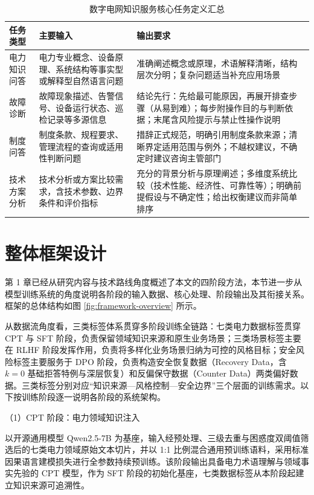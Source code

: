\documentclass[fontset=fandol,type=master,campus=shenzhen,etitleauto=true]{hithesisbook}
\begin{document}
\begin{table}[htbp]
\centering
\caption{数字电网知识服务核心任务定义汇总}
\label{tab:task-def}
\small
\begin{tabular}{p{2.5cm}p{4.5cm}p{6.0cm}}
\toprule
\textbf{任务类型} & \textbf{主要输入} & \textbf{输出要求} \\
\midrule
电力知识问答 & 电力专业概念、设备原理、系统结构等事实型或解释型自然语言问题 & 准确阐述概念或原理，术语解释清晰，结构层次分明；复杂问题适当补充应用场景 \\
\addlinespace
故障诊断 & 故障现象描述、告警信号、设备运行状态、巡检记录等多源信息 & 结论先行：先给最可能原因，再展开排查步骤（从易到难）；每步附操作目的与判断依据；末尾含风险提示与禁止性操作说明 \\
\addlinespace
制度问答 & 制度条款、规程要求、管理流程的查询或适用性判断问题 & 措辞正式规范，明确引用制度条款来源；清晰界定适用范围与例外；不越权建议，不确定时建议咨询主管部门 \\
\addlinespace
技术方案分析 & 技术分析或方案比较需求，含技术参数、边界条件和评价指标 & 充分的背景分析与原理阐述；多维度系统比较（技术性能、经济性、可靠性等）；明确前提假设与不确定性；给出权衡建议而非简单排序 \\
\bottomrule
\end{tabular}
\end{table}

\section{整体框架设计}\label{ux6574ux4f53ux6846ux67b6ux8bbeux8ba1}

第 1 章已经从研究内容与技术路线角度概述了本文的四阶段方法，本节进一步从模型训练系统的角度说明各阶段的输入数据、核心处理、阶段输出及其衔接关系。框架的总体结构如图 \ref{fig:framework-overview} 所示。

从数据流角度看，三类标签体系贯穿多阶段训练全链路：七类电力数据标签贯穿 CPT 与 SFT 阶段，负责保留领域知识来源和原生业务场景；三类场景标签主要在 RLHF 阶段发挥作用，负责将多样化业务场景归纳为可控的风格目标；安全风险标签主要服务于 DPO 阶段，负责构造安全恢复数据（Recovery Data，含 $k=0$ 基础拒答特例与深层恢复）和反偏保守数据（Counter Data）两类偏好数据。三类标签分别对应“知识来源—风格控制—安全边界”三个层面的训练需求。以下按训练阶段逐一说明各阶段的系统架构。

\noindent （1）CPT 阶段：电力领域知识注入

以开源通用模型 Qwen2.5-7B\cite{ref55} 为基座，输入经预处理、三级去重与困惑度双阈值筛选后的七类电力领域原始文本切片，并以 1:1 比例混合通用预训练语料，采用标准因果语言建模损失进行全参数持续预训练。该阶段输出具备电力术语理解与领域事实先验的 CPT 模型，作为 SFT 阶段的初始化基座，七类数据标签从本阶段起建立知识来源可追溯性。
\end{document}
